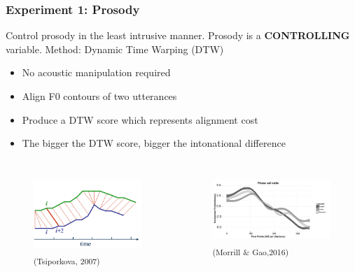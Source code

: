 \documentclass{beamer}
\begin{document}
\begin{frame}
\frametitle{Experiment 1: Prosody}
Control prosody in the least intrusive manner.  \linebreak
Prosody is a {\bf CONTROLLING} variable.  
\linebreak
\linebreak
Method: Dynamic Time Warping (DTW) 
\begin{itemize}
\item No acoustic manipulation required
\item Align F0 contours of two utterances
\item Produce a DTW score which represents alignment cost
\item The bigger the DTW score, bigger the intonational difference
\end{itemize}
\begin{columns}[c] %
\begin{figure}
\includegraphics[width=0.8\linewidth]{figures/dtw1}
\linebreak \textsubscript{(Tsiporkova, 2007) }
\end{figure}
\begin{figure}
\includegraphics[width=0.9\linewidth]{figures/dtw2}
\linebreak\textsubscript{(Morrill \& Gao,2016)}
\end{figure}
\end{columns}
\end{frame}
\end{document}
